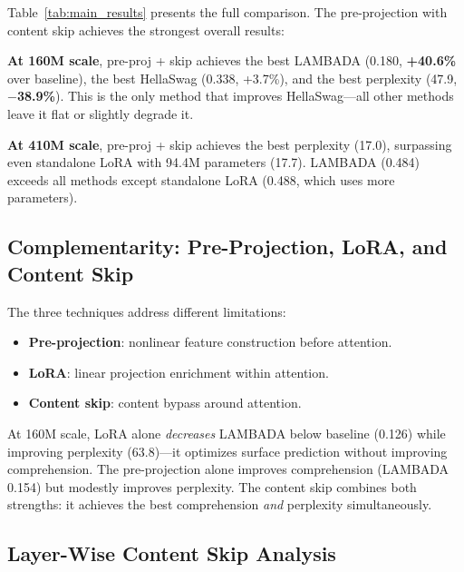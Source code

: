 \documentclass[11pt]{article}
\begin{document}
Table~\ref{tab:main_results} presents the full comparison. The pre-projection with content skip achieves the strongest overall results:

\textbf{At 160M scale}, pre-proj + skip achieves the best LAMBADA (0.180, \textbf{+40.6\%} over baseline), the best HellaSwag (0.338, +3.7\%), and the best perplexity (47.9, \textbf{$-$38.9\%}). This is the only method that improves HellaSwag---all other methods leave it flat or slightly degrade it.

\textbf{At 410M scale}, pre-proj + skip achieves the best perplexity (17.0), surpassing even standalone LoRA with 94.4M parameters (17.7). LAMBADA (0.484) exceeds all methods except standalone LoRA (0.488, which uses more parameters).

\subsection{Complementarity: Pre-Projection, LoRA, and Content Skip}

The three techniques address different limitations:
\begin{itemize}
    \item \textbf{Pre-projection}: nonlinear feature construction before attention.
    \item \textbf{LoRA}: linear projection enrichment within attention.
    \item \textbf{Content skip}: content bypass around attention.
\end{itemize}

At 160M scale, LoRA alone \textit{decreases} LAMBADA below baseline (0.126) while improving perplexity (63.8)---it optimizes surface prediction without improving comprehension. The pre-projection alone improves comprehension (LAMBADA 0.154) but modestly improves perplexity. The content skip combines both strengths: it achieves the best comprehension \textit{and} perplexity simultaneously.

\subsection{Layer-Wise Content Skip Analysis}
\end{document}
